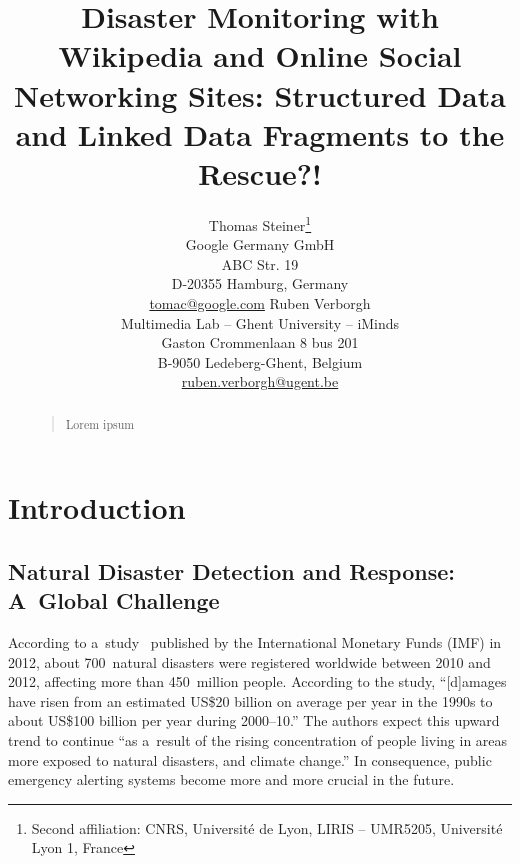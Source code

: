 \documentclass[letterpaper]{article}
\begin{document}
%
\title{Disaster Monitoring with Wikipedia and Online Social Networking Sites: Structured Data and Linked Data Fragments to the Rescue?!}
\author{Thomas Steiner\thanks{Second affiliation: CNRS, Université de Lyon, LIRIS -- UMR5205, Université Lyon 1, France}\\
Google Germany GmbH\\
ABC Str. 19\\
D-20355 Hamburg, Germany\\
\url{tomac@google.com}
\And
Ruben Verborgh\\
Multimedia Lab -- Ghent University -- iMinds\\
Gaston Crommenlaan 8 bus 201\\
B-9050 Ledeberg-Ghent, Belgium\\
\url{ruben.verborgh@ugent.be}
}
\maketitle
\begin{abstract}
\begin{quote}
Lorem ipsum
\end{quote}
\end{abstract}

\section{Introduction}

\subsection{Natural Disaster Detection and Response: A~Global Challenge}
\label{sec:natural-disaster-detection}

According to a~study~\cite{laframboise2012naturaldisasters}
published by the International Monetary Funds (IMF) in 2012,
about 700~natural disasters were registered worldwide between 2010 and 2012,
affecting more than 450~million people.
According to the study, ``[d]amages have risen
from an estimated US\$20 billion on average per year
in the 1990s to about US\$100 billion per year during 2000--10.''
The authors expect this upward trend to continue
``as a~result of the rising concentration of people
living in areas more exposed to natural disasters,
and climate change.''
In consequence, public emergency alerting systems
become more and more crucial in the future.
\end{document}
